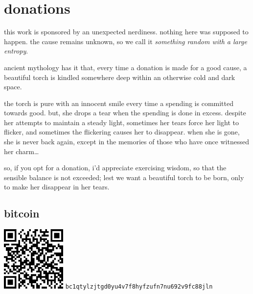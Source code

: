 \documentclass[twocolumn]{article}
\begin{document}
\vfill
\break
\appendix
\section{donations}
this work is sponsored by an unexpected nerdiness.  nothing here was
supposed to happen.  the cause  remains unknown, so we call it
\emph{something random with a large entropy}.

ancient mythology has it that, every time a donation is made for a good
cause, a beautiful torch is kindled somewhere deep within an otherwise cold
and dark space.

the torch is pure with an innocent smile every time a spending is committed
towards good.  but, she drops a tear when the spending is done in excess.
despite her attempts to maintain a steady light, sometimes her tears force
her light to flicker, and sometimes the flickering causes her to disappear.
when she is gone, she is never back again, except in the memories of those
who have once witnessed her charm\ldots

so, if you opt for a donation, i'd appreciate exercising wisdom, so that
the sensible balance is not exceeded; lest we want a beautiful torch to be
born, only to make her disappear in her tears.

\subsection{bitcoin}
\begin{center}
    \includegraphics[width=121px]{./pics/btc_wallet_address_trimmed.png}
    \texttt{bc1qtylzjtgd0yu4v7f8hyfzufn7nu692v9fc88jln}
\end{center}
\end{document}
